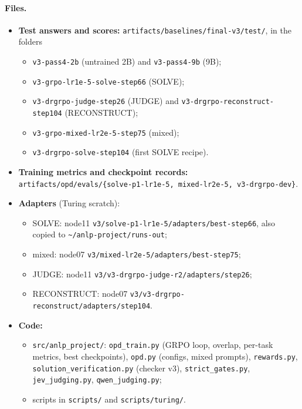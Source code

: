 \documentclass[10pt,a4paper]{article}
\begin{document}
\paragraph{Files.}
\begin{itemize}
\item \textbf{Test answers and scores:} \texttt{artifacts/baselines/final-v3/test/}, in the folders
  \begin{itemize}
  \item \texttt{v3-pass4-2b} (untrained 2B) and \texttt{v3-pass4-9b} (9B);
  \item \texttt{v3-grpo-lr1e-5-solve-step66} (SOLVE);
  \item \texttt{v3-drgrpo-judge-step26} (JUDGE) and \texttt{v3-drgrpo-reconstruct-step104} (RECONSTRUCT);
  \item \texttt{v3-grpo-mixed-lr2e-5-step75} (mixed);
  \item \texttt{v3-drgrpo-solve-step104} (first SOLVE recipe).
  \end{itemize}
\item \textbf{Training metrics and checkpoint records:} \texttt{artifacts/opd/evals/\{solve-p1-lr1e-5, mixed-lr2e-5,
      v3-drgrpo-dev\}}.
\item \textbf{Adapters} (Turing scratch):
  \begin{itemize}
  \item SOLVE: node11 \texttt{v3/solve-p1-lr1e-5/adapters/best-step66}, also copied to
        \texttt{\textasciitilde/anlp-project/runs-out};
  \item mixed: node07 \texttt{v3/mixed-lr2e-5/adapters/best-step75};
  \item JUDGE: node11 \texttt{v3/v3-drgrpo-judge-r2/adapters/step26};
  \item RECONSTRUCT: node07 \texttt{v3/v3-drgrpo-reconstruct/adapters/step104}.
  \end{itemize}
\item \textbf{Code:}
  \begin{itemize}
  \item \texttt{src/anlp\_project/}: \texttt{opd\_train.py} (GRPO loop, overlap, per-task metrics, best checkpoints),
        \texttt{opd.py} (configs, mixed prompts), \texttt{rewards.py}, \texttt{solution\_verification.py} (checker
        v3), \texttt{strict\_gates.py}, \texttt{jev\_judging.py}, \texttt{qwen\_judging.py};
  \item scripts in \texttt{scripts/} and \texttt{scripts/turing/}.
  \end{itemize}
\end{itemize}
\end{document}
